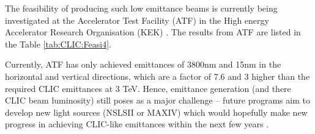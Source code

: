 \begin{table}[!htb]
\caption{Required parameters of the beam before injection and at extraction from the damping rings (emittance parameters). \cite{CLIC:Concept}}
\label{tab:CLIC:Feasi3}
\end{table}

The feasibility of producing such low emittance beams is currently being investigated at the Accelerator Test Facility (ATF) \cite{KEK:ATF} in the High energy Accelerator Research Organisation (KEK) \cite{KEK}. The results from ATF are listed in the Table \ref{tab:CLIC:Feasi4}.

Currently, ATF has only achieved emittances of 3800nm and 15nm in the horizontal and vertical directions, which are a factor of 7.6 and 3 higher than the required CLIC emittances at 3 TeV. Hence, emittance generation (and there CLIC beam luminosity) still poses as a major challenge – future programs aim to develop new light sources (NSLSII or MAXIV) which would hopefully make new progress in achieving CLIC-like emittances within the next few years \cite{CLIC:Concept}.

\begin{table}[!htb]
\caption{Major parameters related to achieving ultra-low emittances of main beam in the Acceleration Test Facility, compared to the nominal parameter values for CLIC at two energy stages (500 GeV and 3 TeV). \cite{CLIC:Concept}}
\label{tab:CLIC:Feasi4}
\end{table}

